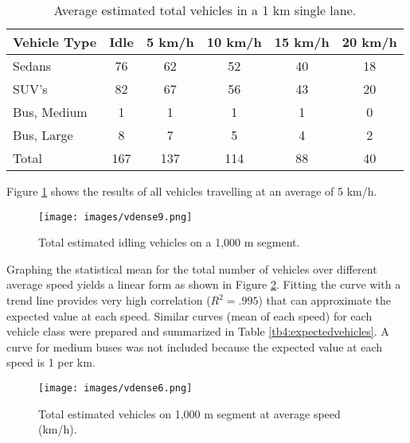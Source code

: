 \begin{table}[H]
\centering
\caption{Average estimated total vehicles in a 1 km single lane.}
\label{tab:meanvehdensity}
\begin{tabular}{@{}lccccc@{}}
\toprule
\textbf{Vehicle Type} & \textbf{Idle} & \textbf{5 km/h} & \textbf{10 km/h} & \textbf{15 km/h} & \textbf{20 km/h} \\ \midrule
Sedans & 76 & 62 & 52 & 40 & 18 \\
SUV's & 82 & 67 & 56 & 43 & 20 \\
Bus, Medium & 1 & 1 & 1 & 1 & 0 \\
Bus, Large & 8 & 7 & 5 & 4 & 2 \\
Total & 167 & 137 & 114 & 88 & 40 \\ \bottomrule
\end{tabular}
\end{table}

Figure \ref{fig6:estimatedobs} shows the results of all vehicles travelling at an average of 5 km/h.
 
%
\begin{figure}[H]
\texttt{[image: images/vdense9.png]} 
\caption{Total estimated idling vehicles on a 1,000 m segment.}
\label{fig6:estimatedobs}
\end{figure}
%

Graphing the statistical mean for the total number of vehicles over different average speed yields a linear form as shown in Figure \ref{fig9:estimateavemix}.  Fitting the curve with a trend line provides very high correlation ($R^{2} = .995$) that can approximate the expected value at each speed.  Similar curves (mean of each speed) for each vehicle class were prepared and summarized in Table \ref{tb4:expectedvehicles}.  A curve for medium buses was not included because the expected value at each speed is 1 per km.

%
\begin{figure}[H]
\texttt{[image: images/vdense6.png]}
\caption{Total estimated vehicles on 1,000 m segment at average speed (km/h).}
\label{fig9:estimateavemix}
\end{figure}
% 

